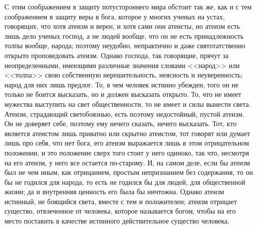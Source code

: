 \documentclass[12pt]{article}
\begin{document}
С этим соображением в защиту потустороннего мира обстоит так же, как и с тем соображением в защиту веры в бога, которое у многих ученых на устах, говорящих, что хотя атеизм и верен, и хотя сами они атеисты, но атеизм есть лишь дело ученых господ, а не людей вообще, что он не есть принадлежность толпы вообще, народа; поэтому неудобно, непрактично и даже святотатственно открыто проповедовать атеизм. Однако господа, так говорящие, прячут за неопределенными, имеющими различные значения словами <<народ>> или <<толпа>> свою собственную нерешительность, неясность и неуверенность; народ для них лишь предлог. То, в чем человек истинно убежден, того он не только не боится высказать, но и должен высказать открыто. То, что не имеет мужества выступить на свет общественности, то не имеет и силы вынести света. Атеизм, страдающий светобоязнью, есть поэтому недостойный, пустой атеизм. Он не доверяет себе, поэтому ему нечего сказать, нечего высказать. Тот, кто является атеистом лишь приватно или скрытно атеистом, тот говорят или думает лишь про себя, что нет бога, его атеизм выражается лишь в этом отрицательном положении, и это положение сверх того стоит у него одиноко, так что, несмотря на его атеизм, у него все остается по-старому. И, на самом деле, если бы атеизм был не чем иным, как отрицанием, простым непризнанием без содержания, то он бы не годился для народа, то есть не годился бы для людей, для общественной жизни; да и внутренняя ценность его была бы ничтожна. Однако атеизм истинный, не боящийся света, вместе с тем и положителен; атеизм отрицает существо, отвлеченное от человека, которое называется богом, чтобы на его место поставить в качестве истинного действительное существо человека. 
\end{document}
